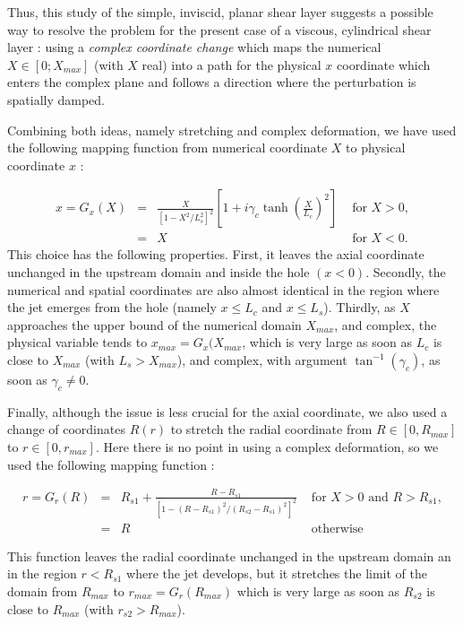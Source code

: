 \documentclass{jfm}
\newcommand\be{\begin{equation}}
\newcommand\ee{\end{equation}}
\begin{document}
Thus, this study of the simple, inviscid, planar shear layer suggests a possible way to resolve the problem for the present case of a viscous, cylindrical shear layer : using a { \em  complex coordinate change} which maps the numerical $X \in [0;X_{max}]$ (with $X$ real) into a path for the physical $x$ coordinate which enters the complex plane and follows a direction where the perturbation is spatially damped.

Combining both ideas, namely stretching and complex deformation, we have used the following mapping function from numerical coordinate $X$ to physical coordinate $x$ :

\be
\begin{array}{rcll}
x = G_x(X) &=& \frac{X}{\left[1-X^2/L_s^2 \right]^2} \left[ 1 + i \gamma_c \tanh \left(\frac{X}{L_c}\right)^2  \right]  & \mbox{ for } X>0, \\
	& = & X & \mbox{ for } X<0.
\end{array}
\label{eq:mapX}
\ee
This choice has the following properties. First, it leaves the axial coordinate unchanged in the upstream domain and inside the hole $(x<0)$. Secondly, the numerical and spatial coordinates are also almost identical in the region where the jet emerges from the hole (namely  $x \leq L_c$ and $x \leq L_s$). Thirdly, as $X$ approaches the upper bound of the numerical domain $X_{max}$, and complex, the 
physical variable tends to $x_{max}= G_x(X_{max}$, which is very large as soon as $L_c$ is close to $X_{max}$
(with $L_s > X_{max}$), and complex, with argument $\tan^{-1} (\gamma_c)$, as soon as $\gamma_c \neq 0$.

Finally, although the issue is less crucial for the axial coordinate, we also used a change of coordinates $R(r)$ to stretch the radial coordinate from $R \in [0,R_{max}]$ to $r \in [0,r_{max}]$. Here there is no point in using a complex deformation, so we used the following mapping function :

\be
\begin{array}{rcll}
r= G_r(R) &=& 
R_{s1} + \displaystyle \frac{R-R_{s1}}{\left[1-(R-R_{s1})^2/(R_{s2}-R_{s1})^2 \right]^2}  & \mbox{ for } X>0 \mbox{ and } R>R_{s1}, \\
	& = & R & \mbox{  otherwise }
\end{array}
\label{eq:mapR}
\ee

This function leaves the radial coordinate unchanged in the upstream domain an in the region $r<R_{s1}$ where the jet develops, but it stretches the limit of the domain from $R_{max}$ to $r_{max} = G_r(R_{max})$ which is very
large as soon as $R_{s2}$ is close to $R_{max}$ (with $r_{s2} > R_{max}$).
\end{document}
